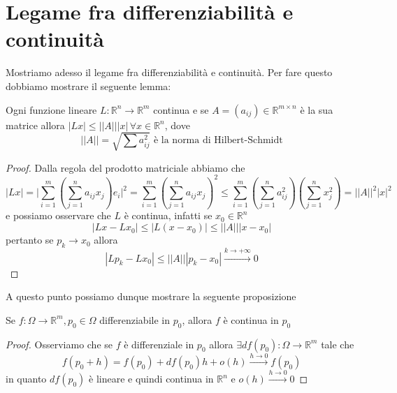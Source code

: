 \documentclass[openany, italian]{book}
\begin{document}
\section{Legame fra differenziabilità e continuità}
Mostriamo adesso il legame fra differenziabilità e continuità. Per fare questo dobbiamo mostrare il seguente lemma:
\begin{lemma}
Ogni funzione lineare $L: \mathbb{R}^n \to \mathbb{R}^m$ continua e se $A = (a_{ij}) \in \mathbb{R}^{m \times n}$ è la sua matrice allora $|Lx| \leq || A || |x|  \, \forall x \in \mathbb{R}^n$, dove
$$
|| A || = \sqrt{\sum a_{ij}^2} \text{ è la norma di Hilbert-Schmidt}
$$
\end{lemma}
\begin{proof}
Dalla regola del prodotto matriciale abbiamo che
$$
|Lx| = \Bigg| \sum_{i=1}^m \left( \sum_{j=1}^n a_{ij} x_j \right)e_i \Bigg|^2 = \sum_{i=1}^m \left( \sum_{j=1}^n a_{ij} x_j \right)^2 \leq \sum_{i=1}^m \left( \sum_{j=1}^n a_{ij}^2 \right)  \left( \sum_{j=1}^n x_j^2 \right) = || A ||^2 |x|^2
$$
e possiamo osservare che $L$ è continua, infatti se $x_0 \in \mathbb{R}^n$
$$
|Lx - Lx_0| \leq |L(x-x_0)| \leq || A || |x-x_0|
$$
pertanto se $p_k \to x_0$ allora
$$
|Lp_k - Lx_0| \leq || A || |p_k-x_0| \stackrel{k \to +\infty}{\to} 0
$$
\end{proof}
A questo punto possiamo dunque mostrare la seguente proposizione
\begin{prop}
Se $f: \Omega \to \mathbb{R}^m, p_0 \in \Omega$ differenziabile in $p_0$, allora $f$ è continua in $p_0$
\end{prop}
\begin{proof}
Osserviamo che se $f$ è differenziale in $p_0$ allora $\exists df(p_0): \Omega \to \mathbb{R}^m$ tale che
$$
f(p_0 + h) = f(p_0) + df(p_0)h + o(h) \stackrel{h \to 0}{\to} f(p_0)
$$
in quanto $df(p_0)$ è lineare e quindi continua in $\mathbb{R}^n$ e $o(h) \stackrel{h \to 0}{\to} 0$
\end{proof}
\end{document}
